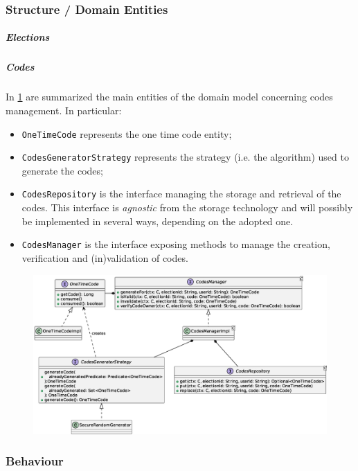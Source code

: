 \documentclass{scrartcl}
\begin{document}
\subsubsection{Structure / Domain Entities}

\subparagraph*{Elections}


\subparagraph*{Codes}

In \cref{fig:codes-design} are summarized the main entities of the domain model concerning codes management.
%
In particular:
%
\begin{itemize}
    \item \texttt{OneTimeCode} represents the one time code entity;
    \item \texttt{CodesGeneratorStrategy} represents the strategy (i.e. the algorithm) used to generate the codes;
    \item \texttt{CodesRepository} is the interface managing the storage and retrieval of the codes. This interface is \textit{agnostic} from the storage technology and will possibly be implemented in several ways, depending on the adopted one.
    \item \texttt{CodesManager} is the interface exposing methods to manage the creation, verification and (in)validation of codes. 
\end{itemize}


\begin{figure}[h]
    \centering
    \includegraphics[width=\linewidth]{figures/codes-design.eps}
    \caption{}
    \label{fig:codes-design} 
\end{figure}

\subsubsection{Behaviour}
\end{document}
